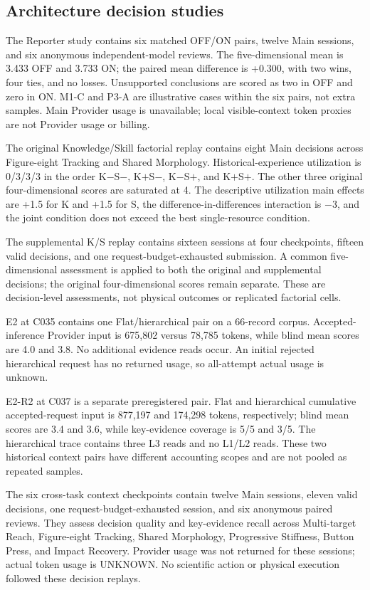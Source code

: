 \subsection{Architecture decision studies}

The Reporter study contains six matched OFF/ON pairs, twelve Main sessions, and six anonymous independent-model reviews. The five-dimensional mean is 3.433 OFF and 3.733 ON; the paired mean difference is +0.300, with two wins, four ties, and no losses. Unsupported conclusions are scored as two in OFF and zero in ON. M1-C and P3-A are illustrative cases within the six pairs, not extra samples. Main Provider usage is unavailable; local visible-context token proxies are not Provider usage or billing.

The original Knowledge/Skill factorial replay contains eight Main decisions across Figure-eight Tracking and Shared Morphology. Historical-experience utilization is 0/3/3/3 in the order K$-$S$-$, K$+$S$-$, K$-$S$+$, and K$+$S$+$. The other three original four-dimensional scores are saturated at 4. The descriptive utilization main effects are +1.5 for K and +1.5 for S, the difference-in-differences interaction is $-3$, and the joint condition does not exceed the best single-resource condition.

The supplemental K/S replay contains sixteen sessions at four checkpoints, fifteen valid decisions, and one request-budget-exhausted submission. A common five-dimensional assessment is applied to both the original and supplemental decisions; the original four-dimensional scores remain separate. These are decision-level assessments, not physical outcomes or replicated factorial cells.

E2 at C035 contains one Flat/hierarchical pair on a 66-record corpus. Accepted-inference Provider input is 675,802 versus 78,785 tokens, while blind mean scores are 4.0 and 3.8. No additional evidence reads occur. An initial rejected hierarchical request has no returned usage, so all-attempt actual usage is unknown.

E2-R2 at C037 is a separate preregistered pair. Flat and hierarchical cumulative accepted-request input is 877,197 and 174,298 tokens, respectively; blind mean scores are 3.4 and 3.6, while key-evidence coverage is 5/5 and 3/5. The hierarchical trace contains three L3 reads and no L1/L2 reads. These two historical context pairs have different accounting scopes and are not pooled as repeated samples.

The six cross-task context checkpoints contain twelve Main sessions, eleven valid decisions, one request-budget-exhausted session, and six anonymous paired reviews. They assess decision quality and key-evidence recall across Multi-target Reach, Figure-eight Tracking, Shared Morphology, Progressive Stiffness, Button Press, and Impact Recovery. Provider usage was not returned for these sessions; actual token usage is UNKNOWN. No scientific action or physical execution followed these decision replays.

